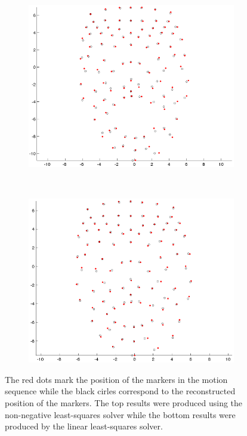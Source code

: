 \documentclass[11pt]{report}
\begin{document}
\begin{figure}[htbp!]
\begin{subfigure}[b]{0.3\textwidth}
        \end{subfigure}%
        ~ %
        \begin{subfigure}[b]{0.3\textwidth}
                \includegraphics[width=\textwidth]{img/weights/3D/w3/w3_400.png}
        \end{subfigure}
        ~ %
        \begin{subfigure}[b]{0.3\textwidth}
                \includegraphics[width=\textwidth]{img/weights/3D/w3/w3_600.png} 
        \end{subfigure}
        \caption{The red dots mark the position of the markers in the motion sequence while the black cirles correspond to the reconstructed position of the markers. The top results were produced using the non-negative least-squares solver while the bottom results were produced by the linear least-squares solver. }\label{fig:errorw2w3}
\end{figure}
\end{document}

